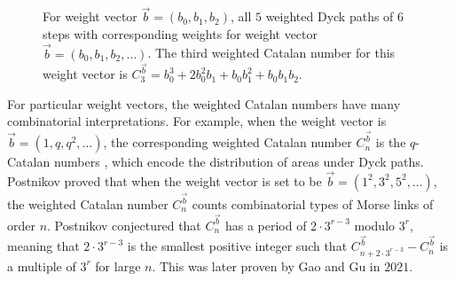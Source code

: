 \documentclass[12pt,notitlepage]{amsart}
\numberwithin{equation}{section}
\theoremstyle{thmstyleone}%
\theoremstyle{thmstyletwo}%
\theoremstyle{thmstylethree}%
\numberwithin{theorem}{section}
\numberwithin{equation}{section}
\begin{document}
\begin{figure}[H]
\begin{minipage}{0.19\linewidth}
\vspace{-0.6 em}
\end{minipage}
\hfill
\begin{minipage}{0.19\linewidth}
\centering
{}
\vspace{-0.6 em}
\end{minipage}
   \caption{For weight vector $\vec{b}= (b_0,b_1,b_2)$, all $5$ weighted Dyck paths of $6$ steps with corresponding weights for weight vector $\vec{b} = (b_0,b_1, b_2, \dots)$. The third weighted Catalan number for this weight vector is $C^{\vec{b}}_3 = b_0^3 + 2b_0^2b_1 + b_0b_1^2+ b_0b_1b_2$.}
    \label{fig:2ddycklength3}
    \end{figure}
    

 
 
 For particular weight vectors, the weighted Catalan numbers have many combinatorial interpretations. For example, when the weight vector is $\vec{b} = (1, q, q^2, \dots)$, the corresponding weighted Catalan number $C_n^{\vec{b}}$ is the $q$-Catalan numbers \cite{qcatalan}, which encode the distribution of areas under Dyck paths. Postnikov \cite{postnikov2000counting} proved that when the weight vector is set to be $\vec{b} = (1^2, 3^2, 5^2, \dots)$, the weighted Catalan number $C^{\vec{b}}_n$ counts combinatorial types of Morse links of order $n$. Postnikov conjectured that $C^{\vec{b}}_n$ has a period of $2\cdot3^{r-3}$ modulo $3^r$, meaning that $2\cdot 3^{r-3}$ is the smallest positive integer such that $C_{n+2\cdot 3^{r-3}}^{\vec{b}}- C_{n}^{\vec{b}}$ is a multiple of $3^r$ for large $n$. This was later proven by Gao and Gu \cite{gaogu} in $2021$. %
\end{document}

